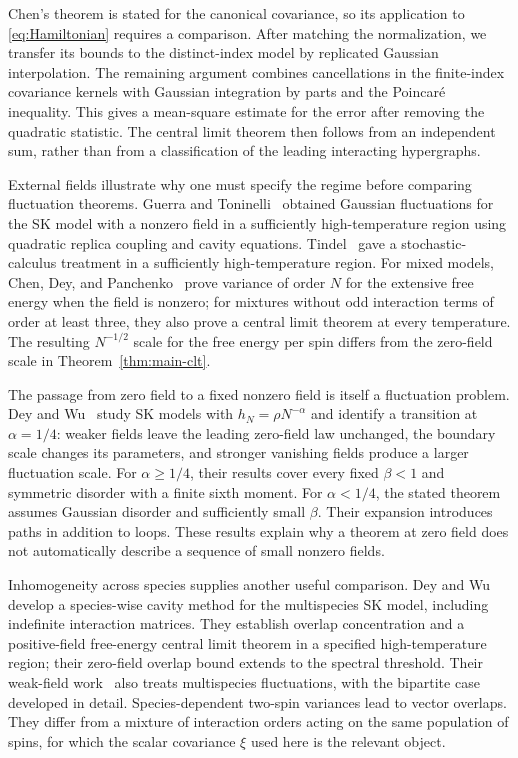 \documentclass[letterpaper,11pt,reqno]{amsart}
\renewcommand{\geq}{\geqslant}
\begin{document}
Chen's theorem is stated for the canonical covariance, so its
application to \eqref{eq:Hamiltonian} requires a comparison. After
matching the normalization, we transfer its bounds to the
distinct-index model by replicated Gaussian interpolation. The
remaining argument combines cancellations in the finite-index
covariance kernels with Gaussian integration by parts and the
Poincar\'e inequality. This gives a mean-square estimate for the
error after removing the quadratic statistic. The central limit
theorem then follows from an independent sum, rather than from a
classification of the leading interacting hypergraphs.

External fields illustrate why one must specify the regime before
comparing fluctuation theorems. Guerra and
Toninelli~\cite{GuerraToninelli2002} obtained Gaussian fluctuations
for the SK model with a nonzero field in a sufficiently
high-temperature region using quadratic replica coupling and cavity
equations. Tindel~\cite{Tindel2005} gave a stochastic-calculus
treatment in a sufficiently high-temperature region. For mixed
models, Chen, Dey, and Panchenko~\cite{ChenDeyPanchenko2017} prove
variance of order $N$ for the extensive free energy when the field is
nonzero; for mixtures without odd interaction terms of order at least
three, they also prove a central limit theorem at every temperature.
The resulting $N^{-1/2}$ scale for the free energy per spin differs
from the zero-field scale in Theorem~\ref{thm:main-clt}.

The passage from zero field to a fixed nonzero field is itself a
fluctuation problem. Dey and Wu~\cite{DeyWuWeakField2023} study SK
models with $h_N=\rho N^{-\alpha}$ and identify a transition at
$\alpha=1/4$: weaker fields leave the leading zero-field law
unchanged, the boundary scale changes its parameters, and stronger
vanishing fields produce a larger fluctuation scale. For
$\alpha\geq1/4$, their results cover every fixed $\beta<1$ and
symmetric disorder with a finite sixth moment. For $\alpha<1/4$,
the stated theorem assumes Gaussian disorder and sufficiently small
$\beta$. Their expansion introduces paths in addition to loops.
These results explain why a theorem at zero field does not
automatically describe a sequence of small nonzero fields.

Inhomogeneity across species supplies another useful comparison.
Dey and Wu~\cite{DeyWuMultiSpecies2021} develop a species-wise cavity
method for the multispecies SK model, including indefinite
interaction matrices. They establish overlap concentration and a
positive-field free-energy central limit theorem in a specified
high-temperature region; their zero-field overlap bound extends to
the spectral threshold. Their weak-field
work~\cite{DeyWuWeakField2023} also treats multispecies
fluctuations, with the bipartite case developed in detail.
Species-dependent two-spin variances lead to vector overlaps.
They differ from a mixture of interaction orders acting on the same
population of spins, for which the scalar covariance $\xi$ used
here is the relevant object.
\end{document}
